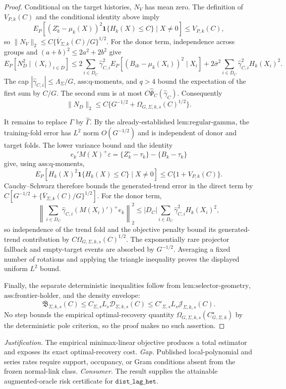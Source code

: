\documentclass{article}
\begin{document}
\begin{proof}
Conditional on the target histories, \(N_V\) has mean zero. The definition of \(V_{P,k}(C)\) and the conditional identity above imply
\[
E_P[(Z_{k}^{\circ}-\mu_k(X))^2\mathbf 1\{H_k(X)\le C\}\mid X\ne0]
\le V_{P,k}(C),
\]
so \(\|N_V\|_2\le C\{\overline V_{\Sigma,k}(C)/G\}^{1/2}\). For the donor term, independence across groups and \((a+b)^2\le2a^2+2b^2\) give
\[
E_P[N_D^2\mid (X_i)_{i\in D}]
\le 2\sum_{i\in D_C}\widehat\gamma_{C,i}^2E_P[(B_{ik}-\mu_k(X_i))^2\mid X_i]
+2\overline\sigma^2\sum_{i\in D_C}\widehat\gamma_{C,i}^2H_k(X_i)^2.
\]
The cap \(|\widehat\gamma_{C,i}|\le\Lambda_\Sigma/G\), \(\text{ass:q-moments}\), and \(q>4\) bound the expectation of the first sum by \(C/G\). The second sum is at most \(C\widehat\Psi_C(\widehat\gamma_C)\). Consequently
\[
\|N_D\|_2\le C\{G^{-1/2}+\Omega_{G,\Sigma,k,s}(C)^{1/2}\}.
\]

It remains to replace \(\Gamma\) by \(\widehat\Gamma\). By the already-established \(\text{lem:regular-gamma}\), the training-fold error has \(L^2\) norm \(O(G^{-1/2})\) and is independent of donor and target folds. The lower variance bound and the identity
\[
e_k'M(X)^+\varepsilon
=\{Z_k^{\circ}-\tau_k\}-\{B_k-\tau_k\}
\]
give, using \(\text{ass:q-moments}\),
\[
E_P[H_k(X)^2\mathbf 1\{H_k(X)\le C\}\mid X\ne0]
\le C\{1+V_{P,k}(C)\}.
\]
Cauchy--Schwarz therefore bounds the generated-trend error in the direct term by \(C[G^{-1/2}+\{\overline V_{\Sigma,k}(C)/G\}^{1/2}]\). For the donor term,
\[
\left\|\sum_{i\in D_C}\widehat\gamma_{C,i}(M(X_i)')^+e_k\right\|_2^2
\le |D_C|\sum_{i\in D_C}\widehat\gamma_{C,i}^2H_k(X_i)^2,
\]
so independence of the trend fold and the objective penalty bound its generated-trend contribution by \(C\Omega_{G,\Sigma,k,s}(C)^{1/2}\). The exponentially rare projector fallback and empty-target events are absorbed by \(G^{-1/2}\). Averaging a fixed number of rotations and applying the triangle inequality proves the displayed uniform \(L^2\) bound.

Finally, the separate deterministic inequalities follow from \(\text{lem:selector-geometry}\), \(\text{ass:frontier-holder}\), and the density envelope:
\[
\overline{\mathfrak B}_{\Sigma,k,s}(C)
\le C_{\Sigma,s}L_s\mathcal D_{\Sigma,k,s}(C)
\le C'_{\Sigma,s}L_s\mathcal J_{\Sigma,k,s}(C).
\]
No step bounds the empirical optimal-recovery quantity \(\Omega_{G,\Sigma,k,s}(C_{G,\Sigma,k}^{\star})\) by the deterministic pole criterion, so the proof makes no such assertion.
\end{proof}
\par\smallskip\noindent \textit{Justification.} The empirical minimax-linear objective produces a total estimator and exposes its exact optimal-recovery cost. \textit{Gap.} Published local-polynomial and series rates require support, occupancy, or Gram conditions absent from the frozen normal-link class. \textit{Consumer.} The result supplies the attainable augmented-oracle risk certificate for \(\texttt{dist\_lag\_het}\).
\end{document}
